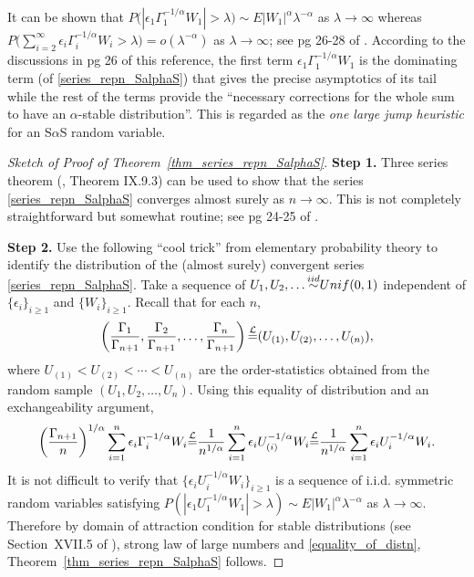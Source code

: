 \documentclass[12pt]{amsart}
\begin{document}
\begin{remark} \label{remark_series_repn_SalphaS} \textnormal{It can be shown that $P\big(|\epsilon_1\Gamma_1^{-1/\alpha} W_1|>\lambda\big) \sim E|W_1|^\alpha \lambda^{-\alpha}$ as $\lambda \to \infty$ whereas $P\big(\sum_{i=2}^\infty\epsilon_i \Gamma_i^{-1/\alpha} W_i>\lambda\big)=o(\lambda^{-\alpha})$ as $\lambda \to \infty$; see pg 26-28 of \cite{samorodnitsky:taqqu:1994}. According to the discussions in pg 26 of this reference, the first term $\epsilon_1\Gamma_1^{-1/\alpha} W_1$ is the dominating term (of \eqref{series_repn_SalphaS}) that gives the precise asymptotics of its tail while the rest of the terms provide the ``necessary corrections for the whole sum to have an $\alpha$-stable distribution''. This is regarded as the \emph{one large jump heuristic} for an S$\alpha$S random variable.}
\end{remark}

\begin{proof}[Sketch of Proof of Theorem~\ref{thm_series_repn_SalphaS}] \textbf{Step 1.} Three series theorem (\cite{feller:1971}, Theorem IX.9.3) can be used to show that the series \eqref{series_repn_SalphaS} converges almost surely as $n \to \infty$. This is not completely straightforward but somewhat routine; see pg 24-25 of \cite{samorodnitsky:taqqu:1994}. \smallskip

\textbf{Step 2.} Use the following ``cool trick'' from elementary probability theory to identify the distribution of the (almost surely) convergent series \eqref{series_repn_SalphaS}. Take a sequence of $U_1, U_2, \ldots {\stackrel{\footnotesize{iid}}{\sim}} Unif(0,1)$ independent of $\{\epsilon_i\}_{i \geq 1}$ and $\{W_i\}_{i \geq 1}$. Recall that for each $n$,
\[
\left(\frac{\Gamma_1}{\Gamma_{n+1}}, \frac{\Gamma_2}{\Gamma_{n+1}}, \ldots, \frac{\Gamma_n}{\Gamma_{n+1}} \right) {\stackrel{\footnotesize{\mathcal{L}}}{=}} (U_{(1)}, U_{(2)}, \ldots, U_{(n)}),
\]
where $U_{(1)} < U_{(2)} <\cdots < U_{(n)}$ are the order-statistics obtained from the random sample $(U_1, U_2, \ldots, U_n)$. Using this equality of distribution and an exchangeability argument,
\begin{equation}
\left(\frac{\Gamma_{n+1}}{n}\right)^{1/\alpha}\sum_{i=1}^n \epsilon_i \Gamma_i^{-1/\alpha} W_i {\stackrel{\footnotesize{\mathcal{L}}}{=}} \frac{1}{n^{1/\alpha}}\sum_{i=1}^n \epsilon_i U_{(i)}^{-1/\alpha} W_i {\stackrel{\footnotesize{\mathcal{L}}}{=}} \frac{1}{n^{1/\alpha}}\sum_{i=1}^n \epsilon_i U_{i}^{-1/\alpha} W_i \label{equality_of_distn}.
\end{equation}
It is not difficult to verify that $\{\epsilon_i U_i^{-1/\alpha} W_i\}_{i \geq 1}$ is a sequence of i.i.d. symmetric random variables satisfying $P(|\epsilon_1 U_1^{-1/\alpha} W_1|>\lambda) \sim E|W_1|^\alpha \lambda^{-\alpha}$ as $\lambda \to \infty$. Therefore by domain of attraction condition for stable distributions (see Section~XVII.5 of \cite{feller:1971}), strong law of large numbers and \eqref{equality_of_distn}, Theorem~\ref{thm_series_repn_SalphaS} follows.
\end{proof}
\end{document}
